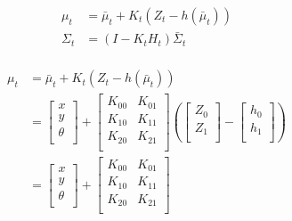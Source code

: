 \documentclass[oneside, 12pt, a4paper]{book}
\begin{document}
\begin{equation}
    \begin{split}
        \mu_t &= \bar{\mu}_t + K_t(Z_t - h(\bar{\mu}_t))\\
        \Sigma_t&= (I-K_tH_t)\bar{\Sigma}_t\\
    \end{split}
\end{equation}

\begin{equation}
    \begin{split}
        \mu_t &= \bar{\mu}_t + K_t(Z_t - h(\bar{\mu}_t))\\
        &= 
        \begin{bmatrix}
            x\\
            y\\ 
            \theta\\
        \end{bmatrix} 
        +
        \begin{bmatrix}
            K_{00} & K_{01}\\
            K_{10} & K_{11}\\ 
            K_{20} & K_{21}\\
        \end{bmatrix} 
        \left(
            \begin{bmatrix}
                Z_{0}\\
                Z_{1}\\ 
            \end{bmatrix}
            -
            \begin{bmatrix}
                h_{0}\\
                h_{1}\\ 
            \end{bmatrix} 
        \right)\\
        &=
        \begin{bmatrix}
            x\\
            y\\ 
            \theta\\
        \end{bmatrix} 
        +
        \begin{bmatrix}
            K_{00} & K_{01}\\
            K_{10} & K_{11}\\ 
            K_{20} & K_{21}\\
        \end{bmatrix} 

\end{split}
\end{equation}
\end{document}
